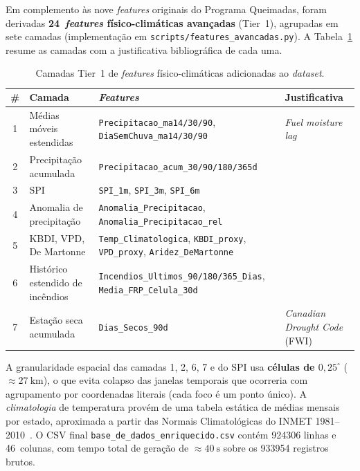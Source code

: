 Em complemento às nove \emph{features} originais do Programa Queimadas, foram derivadas \textbf{24~\emph{features} físico-climáticas avançadas} (Tier~1), agrupadas em sete camadas (implementação em \texttt{scripts/features\_avancadas.py}). A Tabela~\ref{tab:metod_tier1} resume as camadas com a justificativa bibliográfica de cada uma.

\begin{table}[h]
\centering
\caption{Camadas Tier~1 de \emph{features} físico-climáticas adicionadas ao \emph{dataset}.}
\label{tab:metod_tier1}
\small
\begin{tabular}{clp{6cm}l}
\toprule
\textbf{\#} & \textbf{Camada} & \textbf{\emph{Features}} & \textbf{Justificativa} \\
\midrule
1 & Médias móveis estendidas & \texttt{Precipitacao\_ma14/30/90}, \texttt{DiaSemChuva\_ma14/30/90} & \emph{Fuel moisture lag}~\cite{seager2015climatology} \\
2 & Precipitação acumulada & \texttt{Precipitacao\_acum\_30/90/180/365d} & \cite{seager2015climatology} \\
3 & SPI & \texttt{SPI\_1m}, \texttt{SPI\_3m}, \texttt{SPI\_6m} & \cite{mckee1993spi,npjhazards2025fire} \\
4 & Anomalia de precipitação & \texttt{Anomalia\_Precipitacao}, \texttt{Anomalia\_Precipitacao\_rel} & \cite{forests2024cerradoamazon} \\
5 & KBDI, VPD, De Martonne & \texttt{Temp\_Climatologica}, \texttt{KBDI\_proxy}, \texttt{VPD\_proxy}, \texttt{Aridez\_DeMartonne} & \cite{keetch1968drought,seager2015climatology,demartonne1926aridity,forests2024cerradoamazon} \\
6 & Histórico estendido de incêndios & \texttt{Incendios\_Ultimos\_90/180/365\_Dias}, \texttt{Media\_FRP\_Celula\_30d} & \cite{cheerala2025probabilistic} \\
7 & Estação seca acumulada & \texttt{Dias\_Secos\_90d} & \emph{Canadian Drought Code} (FWI) \\
\bottomrule
\end{tabular}
\end{table}

A granularidade espacial das camadas 1, 2, 6, 7 e do SPI usa \textbf{células de \(0{,}25^\circ\)} (\(\approx \SI{27}{\km}\)), o que evita colapso das janelas temporais que ocorreria com agrupamento por coordenadas literais (cada foco é um ponto único). A \emph{climatologia} de temperatura provém de uma tabela estática de médias mensais por estado, aproximada a partir das Normais Climatológicas do INMET 1981--2010~\cite{inmetnormais}. O CSV final \texttt{base\_de\_dados\_enriquecido.csv} contém \num{924306} linhas e 46~colunas, com tempo total de geração de \(\approx \SI{40}{\second}\) sobre os \num{933954} registros brutos.

